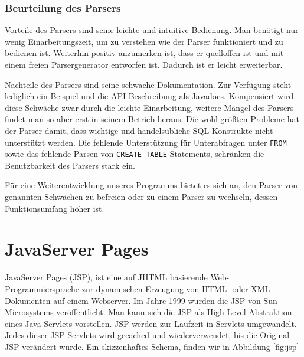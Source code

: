 \subsubsection*{Beurteilung des Parsers}

Vorteile des Parsers sind seine leichte und intuitive Bedienung. Man benötigt nur wenig Einarbeitungszeit, um zu verstehen wie der Parser funktioniert und zu bedienen ist. Weiterhin positiv anzumerken ist, dass er quelloffen ist und mit einem freien Parsergenerator \cite{javacc1} entworfen ist. Dadurch ist er leicht erweiterbar.

Nachteile des Parsers sind seine schwache Dokumentation. Zur Verfügung steht lediglich ein Beispiel und die API-Beschreibung als Javadocs. Kompensiert wird diese Schwäche zwar durch die leichte Einarbeitung, weitere Mängel des Parsers findet man so aber erst in seinem Betrieb heraus. Die wohl größten Probleme hat der Parser damit, dass wichtige und handelsübliche SQL-Konstrukte nicht unterstützt werden. Die fehlende Unterstützung für Unterabfragen unter \verb|FROM| sowie das fehlende Parsen von \verb|CREATE TABLE|-Statements, schränken die Benutzbarkeit des Parsers stark ein. 

Für eine Weiterentwicklung unseres Programms bietet es sich an, den Parser von genannten Schwächen zu befreien oder zu einem Parser zu wechseln, dessen Funktionsumfang höher ist.


\section{JavaServer Pages}

JavaServer Pages (JSP), ist eine auf JHTML basierende Web-Programmiersprache zur dynamischen Erzeugung von HTML- oder XML-Dokumenten auf einem Webserver. Im Jahre 1999 wurden die JSP von Sun Microsystems veröffentlicht. Man kann sich die JSP als High-Level Abstraktion eines Java Servlets vorstellen. JSP werden zur Laufzeit in Servlets umgewandelt. Jedes dieser JSP-Servlets wird gecached und wiederverwendet, bis die Original-JSP verändert wurde. Ein skizzenhaftes Schema, finden wir in Abbildung \ref{fig:jsp}

